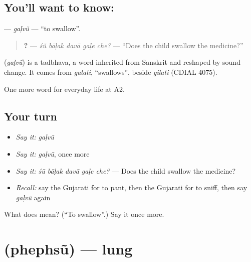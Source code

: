 \subsection*{You'll want to know: }
\textbf{} — \emph{gaḷvũ} — \textquotedblleft{}to swallow\textquotedblright{}.

\begin{quote}
\textbf{    ?} — \emph{śũ bāḷak davā gaḷe che?} — \textquotedblleft{}Does the child swallow the medicine?\textquotedblright{}
\end{quote}

\begin{cousinweb}
\textbf{} (\emph{gaḷvũ}) is a tadbhava, a word inherited from Sanskrit and reshaped by sound change. It comes from \emph{galati}, \textquotedblleft{}swallows\textquotedblright{}, beside \emph{gilati} (CDIAL 4075).
\end{cousinweb}

\begin{grammarlens}[title={What you've built}]
One more word for everyday life at A2.
\end{grammarlens}

\subsection*{Your turn}
\begin{itemize}
\raggedright
  \item \emph{Say it:} \emph{gaḷvũ}
  \item \emph{Say it:} \emph{gaḷvũ}, once more
  \item \emph{Say it:} \emph{śũ bāḷak davā gaḷe che?} — Does the child swallow the medicine?
  \item \emph{Recall:} say the Gujarati for to pant, then the Gujarati for to sniff, then say \emph{gaḷvũ} again
\end{itemize}

\begin{tcolorbox}[breakable,colback=teal!4,colframe=teal!35!black,title={Before you move on}]
What does  mean? (\textquotedblleft{}To swallow\textquotedblright{}.) Say it once more.
\end{tcolorbox}
\section[\texorpdfstring{\gu{ફેફસું} (phephsũ)}{ફેફસું (phephsũ)}]{ (phephsũ) — lung}

